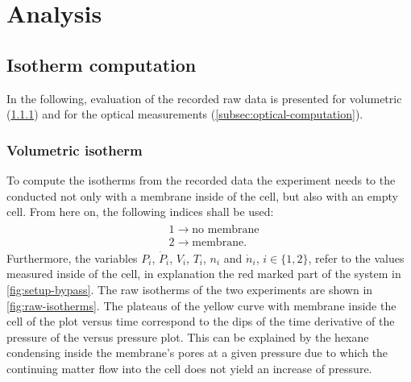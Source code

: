 \documentclass[../thesis.tex]{subfiles}
\begin{document}
    \chapter{Analysis}
    \label{ch:analysis}


      \section{Isotherm computation}
      \label{sec:isotherm-computation}

        In the following, evaluation of the recorded raw data is presented for volumetric (\cref{subsec:volumetric-computation}) and for the optical measurements (\cref{subsec:optical-computation}).


        \subsection{Volumetric isotherm}
        \label{subsec:volumetric-computation}


          To compute the isotherms from the recorded data the experiment needs to the conducted not only with a membrane inside of the cell, but also with an empty cell. From here on, the following indices shall be used:
          \begin{align*}
              \begin{split}
                  &1 \longrightarrow \textrm{no membrane} \\
                  &2 \longrightarrow \textrm{membrane}.
                  \label{eq:index_assignments}
              \end{split}
          \end{align*}
          Furthermore, the variables $P_i$, $\dot{P}_i$, $V_i$, $T_i$, $n_i$ and $\dot{n}_i$, $i\in \{1,2\}$, refer to the values measured inside of the cell, in explanation the red marked part of the system in \cref{fig:setup-bypass}. The raw isotherms of the two experiments are shown in \cref{fig:raw-isotherms}. The plateaus of the yellow curve with membrane inside the cell of the plot versus time  correspond to the dips of the time derivative of the pressure of the versus pressure plot. This can be explained by the hexane condensing inside the membrane's pores at a given pressure due to which the continuing matter flow into the cell does not yield an increase of pressure.
          \medskip

          
\end{document}

